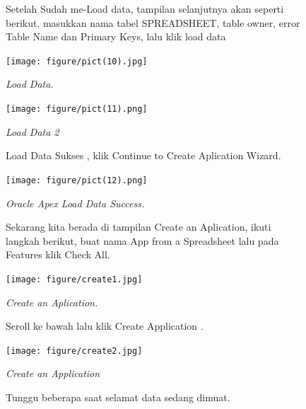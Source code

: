 \begin{enumerate}
\begin{figure}
\item Setelah Sudah me-Load data, tampilan selanjutnya akan seperti berikut. masukkan nama tabel {SPREADSHEET}, table owner, error Table Name dan Primary Keys, lalu klik load data

    \begin{center}
\texttt{[image: figure/pict(10).jpg]}
    \caption{\textit{Load Data.}}
        \end{center}
\label{gambar}
\end{figure}

\begin{figure}
    \begin{center}
\texttt{[image: figure/pict(11).png]}
    \caption{\textit{Load Data 2}}
        \end{center}
\label{gambar}
\end{figure}

\begin{figure}
\item Load Data Sukses , klik Continue to Create Aplication Wizard.

    \begin{center}
\texttt{[image: figure/pict(12).png]}
    \caption{\textit{Oracle Apex Load Data Success.}}
        \end{center}
\label{gambar}
\end{figure}

\begin{figure}
\item Sekarang kita berada di tampilan Create an Aplication, ikuti langkah berikut, buat nama App from a Spreadsheet lalu pada Features klik Check All.

    \begin{center}
\texttt{[image: figure/create1.jpg]}
    \caption{\textit{Create an Aplication.}}
        \end{center}
\label{gambar}
\end{figure}


\begin{figure}
\item Scroll ke bawah lalu klik Create Application .

    \begin{center}
\texttt{[image: figure/create2.jpg]}
    \caption{\textit{Create an Application}}
        \end{center}
\label{gambar}
\end{figure}

\begin{figure}
\item Tunggu beberapa saat selamat data sedang dimuat.


\end{figure}
\end{enumerate}
